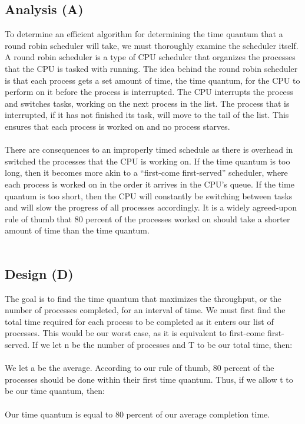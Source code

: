 \documentclass[12pt]{article}
\begin{document}
        \subsection{Analysis (A)}
        To determine an efficient algorithm for determining the time quantum that a round robin scheduler will take, 
        we must thoroughly examine the scheduler itself. A round robin scheduler is a type of CPU scheduler that 
        organizes the processes that the CPU is tasked with running. The idea behind the round robin scheduler is that
         each process gets a set amount of time, the time quantum, for the CPU to perform on it before the process is 
         interrupted. The CPU interrupts the process and switches tasks, working on the next process in the list. The 
         process that is interrupted, if it has not finished its task, will move to the tail of the list. This ensures 
         that each process is worked on and no process starves. \\
         \\
         There are consequences to an improperly timed schedule as there is overhead in switched the processes that the 
         CPU is working on. If the time quantum is too long, then it becomes more akin to a “first-come first-served” 
         scheduler, where each process is worked on in the order it arrives in the CPU’s queue. If the time quantum is too 
         short, then the CPU will constantly be switching between tasks and will slow the progress of all processes accordingly. 
         It is a widely agreed-upon rule of thumb that 80 percent of the processes worked on should take a shorter amount of 
         time than the time quantum.\\
         \\

        \subsection{Design (D)}
        The goal is to find the time quantum that maximizes the throughput, or the number of processes completed, for an interval
        of time. We must first find the total time required for each process to be completed as it enters our list of processes. 
        This would be our worst case, as it is equivalent to first-come first-served. If we let n be the number of processes and 
        T to be our total time, then:\\
        \\
        We let a be the average.
        According to our rule of thumb, 80 percent of the processes should be done within their first time quantum. Thus, if we 
        allow t to be our time quantum, then:\\
        \\        
        Our time quantum is equal to 80 percent of our average completion time.\\
        \\        
\end{document}

